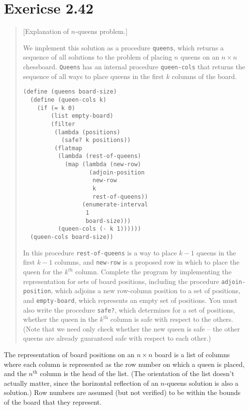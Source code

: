 \documentclass{article}
\begin{document}
\section{Exericse 2.42}
\begin{quote}
    [Explanation of $n$-queens problem.]

    We implement this solution as a procedure \texttt{queens}, which returns a
    sequence of all solutions to the problem of placing $n$ queens on an $n
    \times n$ chessboard.  \texttt{Queens} has an internal procedure
    \texttt{queen-cols} that returns the sequence of all ways to place queens
    in the first $k$ columns of the board.

    \begin{lstlisting}
(define (queens board-size)
  (define (queen-cols k)
    (if (= k 0)
        (list empty-board)
        (filter
         (lambda (positions)
           (safe? k positions))
         (flatmap
          (lambda (rest-of-queens)
            (map (lambda (new-row)
                   (adjoin-position
                    new-row
                    k
                    rest-of-queens))
                 (enumerate-interval
                  1
                  board-size)))
          (queen-cols (- k 1))))))
  (queen-cols board-size))
    \end{lstlisting}

    In this procedure \texttt{rest-of-queens} is a way to place $k - 1$ queens
    in the first $k - 1$ columns, and \texttt{new-row} is a proposed row in
    which to place the queen for the $k^\textrm{th}$ column. Complete the
    program by implementing the representation for sets of board positions,
    including the procedure \texttt{adjoin-position}, which adjoins a new
    row-column position to a set of positions, and \texttt{empty-board}, which
    represents an empty set of positions. You must also write the procedure
    \texttt{safe?}, which determines for a set of positions, whether the queen
    in the $k^\textrm{th}$ column is safe with respect to the others. (Note
    that we need only check whether the new queen is safe -- the other queens
    are already guaranteed safe with respect to each other.)
\end{quote}

The representation of board positions on an $n \times n$ board is a list of
columns where each column is represented as the row number on which a queen is
placed, and the $n^\textrm{th}$ column is the head of the list. (The orientation
of the list doesn't actually matter, since the horizontal reflection of an
$n$-queens solution is also a solution.) Row numbers are assumed (but not
verified) to be within the bounds of the board that they represent.

\end{document}
